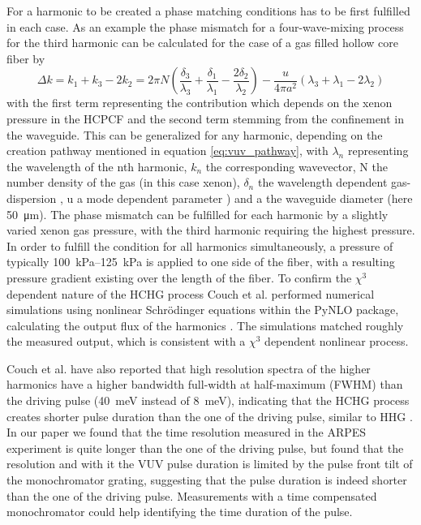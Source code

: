 For a harmonic to be created a phase matching conditions has to be first fulfilled in each case.
As an example the phase mismatch for a four-wave-mixing process for the third harmonic can be calculated for the case of a gas filled hollow core fiber by
\begin{equation}
	\Delta k = k_1 + k_3 - 2k_2 = 2\pi N \left( \frac{\delta_3}{\lambda_3} + \frac{\delta_1}{\lambda_1} - \frac{2\delta_2}{\lambda_2}\right) - \frac{u}{4\pi a^2} (\lambda_3 + \lambda_1 -2\lambda_2)
\end{equation}
with the first term representing the contribution which depends on the xenon pressure in the HCPCF and the second term stemming from the confinement in the waveguide.
This can be generalized for any harmonic, depending on the creation pathway mentioned in equation \ref{eq:vuv_pathway}, with $\lambda_n$ representing the wavelength of the nth harmonic, $k_n$ the corresponding wavevector, N the number density of the gas (in this case xenon), $\delta_n$ the wavelength dependent gas-dispersion \cite{bideau-mehu_measurement_1981}, u a mode dependent parameter \cite{couch_ultrafast_2020,durfee_iii_guided-wave_1999}) and a the waveguide diameter (here \qty{50}{\micro\meter}). 
The phase mismatch can be fulfilled for each harmonic by a slightly varied xenon gas pressure, with the third harmonic requiring the highest pressure.
In order to fulfill the condition for all harmonics simultaneously, a pressure of typically \qtyrange{100}{125}{\kilo\pascal} is applied to one side of the fiber, with a resulting pressure gradient existing over the length of the fiber.
To confirm the $\chi^3$ dependent nature of the HCHG process Couch et al. performed numerical simulations using nonlinear Schrödinger equations within the PyNLO package, calculating the output flux of the harmonics \cite{couch_ultrafast_2020,hult_fourth-order_2007,ycas_g_pynlopynlo_2024}.
The simulations matched roughly the measured output, which is consistent with a $\chi^3$ dependent nonlinear process.

Couch et al. \cite{couch_ultrafast_2020} have also reported that high resolution spectra of the higher harmonics have a higher bandwidth full-width at half-maximum (FWHM) than the driving pulse (\qty{40}{\milli\electronvolt} instead of \qty{8}{\milli\electronvolt}), indicating that the HCHG process creates shorter pulse duration than the one of the driving pulse, similar to HHG \cite{gagnon_soft_2007}.
In our paper \cite{hellbruck_high-resolution_2024} we found that the time resolution measured in the ARPES experiment is quite longer than the one of the driving pulse, but found that the resolution and with it the VUV pulse duration is limited by the pulse front tilt of the monochromator grating, suggesting that the pulse duration is indeed shorter than the one of the driving pulse.
Measurements with a time compensated monochromator could help identifying the time duration of the pulse.


